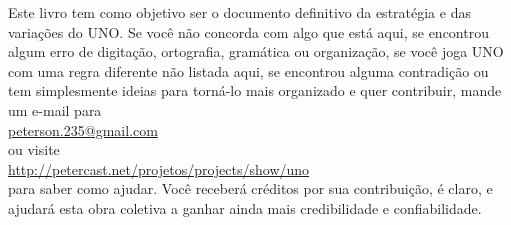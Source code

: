 \documentclass[a5paper,10pt]{book}
\begin{document}
\begin{center}
\begin{small}
Este livro tem como objetivo ser o documento definitivo da estratégia e das variações do UNO. Se você não concorda com algo que está aqui, se encontrou algum erro de digitação, ortografia, gramática ou organização, se você joga UNO com uma regra diferente não listada aqui, se encontrou alguma contradição ou tem simplesmente ideias para torná-lo mais organizado e quer contribuir, mande um e-mail para \\

\href{mailto:peterson.235@gmail.com}{peterson.235@gmail.com} \\

ou visite \\

\url{http://petercast.net/projetos/projects/show/uno} \\

para saber como ajudar. Você receberá créditos por sua contribuição, é claro, e ajudará esta obra coletiva a ganhar ainda mais credibilidade e confiabilidade.
\end{small}
\end{center}
\end{document}

